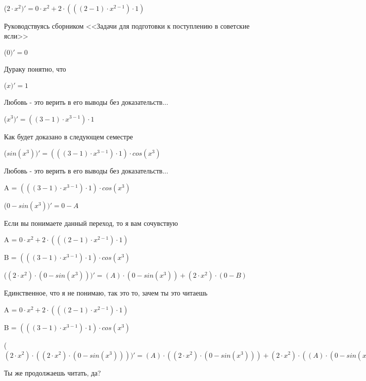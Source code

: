 \documentclass[12pt,a4paper,fleqn]{article}
\begin{document}
\begin{center}
 ($2 \cdot x^{2})'
  = 0 \cdot x^{2}+2 \cdot (((2-1) \cdot x^{2-1}) \cdot 1)$\end{center}
Руководствуясь сборником <<Задачи для подготовки к поступлению в советские ясли>>\cite{link1}

\begin{center}
 ($0)'
  = 0$\end{center}
Дураку понятно, что

\begin{center}
 ($x)'
  = 1$\end{center}
Любовь - это верить в его выводы без доказательств...

\begin{center}
 ($x^{3})'
  = ((3-1) \cdot x^{3-1}) \cdot 1$\end{center}
Как будет доказано в следующем семестре

\begin{center}
 ($sin(x^{3}))'
  = (((3-1) \cdot x^{3-1}) \cdot 1) \cdot cos(x^{3})$\end{center}
Любовь - это верить в его выводы без доказательств...

\begin{center}
A = $(((3-1) \cdot x^{3-1}) \cdot 1) \cdot cos(x^{3})$\end{center}
\begin{center}
 ($0-sin(x^{3}))'
  = 0-A$\end{center}
Если вы понимаете данный переход, то я вам сочувствую

\begin{center}
A = $0 \cdot x^{2}+2 \cdot (((2-1) \cdot x^{2-1}) \cdot 1)$\end{center}
\begin{center}
B = $(((3-1) \cdot x^{3-1}) \cdot 1) \cdot cos(x^{3})$\end{center}
\begin{center}
 ($(2 \cdot x^{2}) \cdot (0-sin(x^{3})))'
  = (A) \cdot (0-sin(x^{3}))+(2 \cdot x^{2}) \cdot (0-B)$\end{center}
Единственное, что я не понимаю, так это то, зачем ты это читаешь

\begin{center}
A = $0 \cdot x^{2}+2 \cdot (((2-1) \cdot x^{2-1}) \cdot 1)$\end{center}
\begin{center}
B = $(((3-1) \cdot x^{3-1}) \cdot 1) \cdot cos(x^{3})$\end{center}
\begin{center}
 ($(2 \cdot x^{2}) \cdot ((2 \cdot x^{2}) \cdot (0-sin(x^{3}))))'
  = (A) \cdot ((2 \cdot x^{2}) \cdot (0-sin(x^{3})))+(2 \cdot x^{2}) \cdot ((A) \cdot (0-sin(x^{3}))+(2 \cdot x^{2}) \cdot (0-B))$\end{center}
Ты же продолжаешь читать, да?
\end{document}
